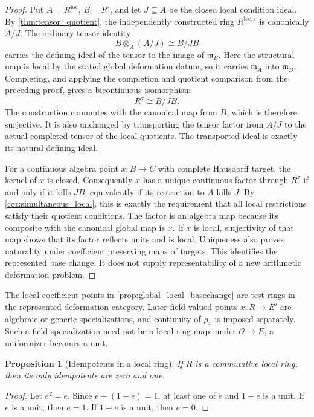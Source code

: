 \documentclass[11pt]{amsart}
\newtheorem{proposition}[proposition]{Proposition}
\theoremstyle{definition}
\theoremstyle{remark}
\newcommand{\OO}{\mathcal O}
\newcommand{\frakm}{\mathfrak m}
\begin{document}
\begin{proof}
Put \(A=R^{\mathrm{loc}}\), \(B=R^\square\), and let \(J\subseteq A\) be the closed local condition ideal. By \cref{thm:tensor_quotient}, the independently constructed ring \(R^{\mathrm{loc},\tau}\) is canonically \(A/J\). The ordinary tensor identity
\[
B\otimes_A(A/J)\cong B/JB
\]
carries the defining ideal of the tensor to the image of \(\frakm_B\). Here the structural map is local by the stated global deformation datum, so it carries \(\frakm_A\) into \(\frakm_B\). Completing, and applying the completion and quotient comparison from the preceding proof, gives a bicontinuous isomorphism
\[
R^\tau\cong B/\overline{JB}.
\]
The construction commutes with the canonical map from \(B\), which is therefore surjective. It is also unchanged by transporting the tensor factor from \(A/J\) to the actual completed tensor of the local quotients. The transported ideal is exactly its natural defining ideal.

For a continuous algebra point \(x:B\to C\) with complete Hausdorff target, the kernel of \(x\) is closed. Consequently \(x\) has a unique continuous factor through \(R^\tau\) if and only if it kills \(JB\), equivalently if its restriction to \(A\) kills \(J\). By \cref{cor:simultaneous_local}, this is exactly the requirement that all local restrictions satisfy their quotient conditions. The factor is an algebra map because its composite with the canonical global map is \(x\). If \(x\) is local, surjectivity of that map shows that its factor reflects units and is local. Uniqueness also proves naturality under coefficient preserving maps of targets. This identifies the represented base change. It does not supply representability of a new arithmetic deformation problem.
\end{proof}

The local coefficient points in \cref{prop:global_local_basechange} are test rings in the represented deformation category. Later field valued points \(x:R\to E'\) are algebraic or generic specializations, and continuity of \(\rho_x\) is imposed separately. Such a field specialization need not be a local ring map: under \(\OO\to E\), a uniformizer becomes a unit.

\begin{proposition}[Idempotents in a local ring]\label{prop:local_idempotent}
If \(R\) is a commutative local ring, then its only idempotents are zero and one.
\end{proposition}

\begin{proof}
Let \(e^2=e\). Since \(e+(1-e)=1\), at least one of \(e\) and \(1-e\) is a unit. If \(e\) is a unit, then \(e=1\). If \(1-e\) is a unit, then \(e=0\).
\end{proof}
\end{document}
